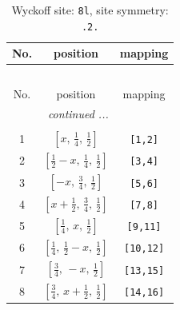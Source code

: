 \documentclass[fleqn,8pt]{jsarticle}
\begin{document}
\begin{longtable}{ccc}
\caption{Wyckoff site: {\tt 8l}, site symmetry: {\tt .2.}}
 \\
 \hline \hline
No. & position & mapping \\ \hline \endfirsthead

\multicolumn{2}{l}{\tablename\ \thetable{}} \\
 \hline \hline
No. & position & mapping \\ \hline \endhead

 \hline \hline
\multicolumn{2}{r}{\footnotesize\it continued ...} \\ \endfoot

 \hline \hline
\multicolumn{2}{r}{} \\ \endlastfoot

1 & $\left[ x,\, \frac{1}{4},\, \frac{1}{2} \right]$ & {\tt [1,2]} \\ \hline
2 & $\left[ \frac{1}{2} - x,\, \frac{1}{4},\, \frac{1}{2} \right]$ & {\tt [3,4]} \\ \hline
3 & $\left[ - x,\, \frac{3}{4},\, \frac{1}{2} \right]$ & {\tt [5,6]} \\ \hline
4 & $\left[ x + \frac{1}{2},\, \frac{3}{4},\, \frac{1}{2} \right]$ & {\tt [7,8]} \\ \hline
5 & $\left[ \frac{1}{4},\, x,\, \frac{1}{2} \right]$ & {\tt [9,11]} \\ \hline
6 & $\left[ \frac{1}{4},\, \frac{1}{2} - x,\, \frac{1}{2} \right]$ & {\tt [10,12]} \\ \hline
7 & $\left[ \frac{3}{4},\, - x,\, \frac{1}{2} \right]$ & {\tt [13,15]} \\ \hline
8 & $\left[ \frac{3}{4},\, x + \frac{1}{2},\, \frac{1}{2} \right]$ & {\tt [14,16]} \\
\end{longtable}
\renewcommand{\arraystretch}{1.2}
\end{document}
